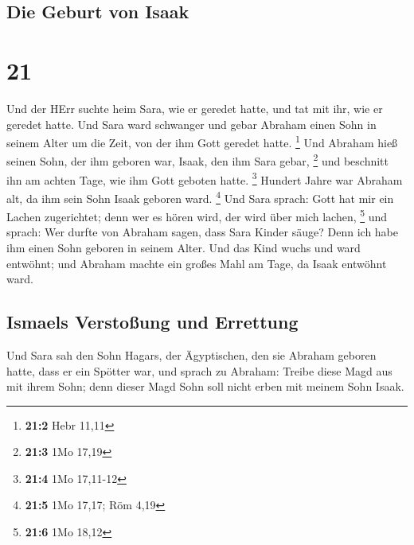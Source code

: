 \hypertarget{die-geburt-von-isaak}{%
\subsection{Die Geburt von Isaak}\label{die-geburt-von-isaak}}

\hypertarget{section-20}{%
\section{21}\label{section-20}}

 Und der HErr suchte heim Sara, wie er geredet hatte, und
tat mit ihr, wie er geredet hatte.  Und Sara ward
schwanger und gebar Abraham einen Sohn in seinem Alter um die Zeit, von
der ihm Gott geredet hatte. \footnote{\textbf{21:2} Hebr 11,11}
 Und Abraham hieß seinen Sohn, der ihm geboren war, Isaak,
den ihm Sara gebar, \footnote{\textbf{21:3} 1Mo 17,19} 
und beschnitt ihn am achten Tage, wie ihm Gott geboten hatte.
\footnote{\textbf{21:4} 1Mo 17,11-12}  Hundert Jahre war
Abraham alt, da ihm sein Sohn Isaak geboren ward. \footnote{\textbf{21:5}
  1Mo 17,17; Röm 4,19}  Und Sara sprach: Gott hat mir ein
Lachen zugerichtet; denn wer es hören wird, der wird über mich lachen,
\footnote{\textbf{21:6} 1Mo 18,12}  und sprach: Wer durfte
von Abraham sagen, dass Sara Kinder säuge? Denn ich habe ihm einen Sohn
geboren in seinem Alter.  Und das Kind wuchs und ward
entwöhnt; und Abraham machte ein großes Mahl am Tage, da Isaak entwöhnt
ward.

\hypertarget{ismaels-verstouxdfung-und-errettung}{%
\subsection{Ismaels Verstoßung und
Errettung}\label{ismaels-verstouxdfung-und-errettung}}

 Und Sara sah den Sohn Hagars, der Ägyptischen, den sie
Abraham geboren hatte, dass er ein Spötter war,  und
sprach zu Abraham: Treibe diese Magd aus mit ihrem Sohn; denn dieser
Magd Sohn soll nicht erben mit meinem Sohn Isaak.

